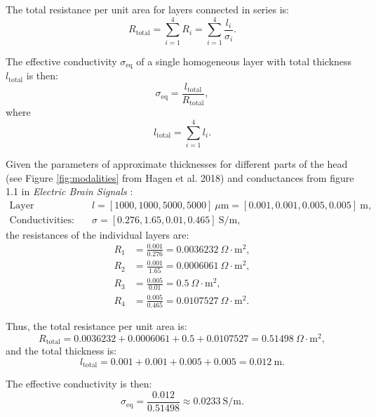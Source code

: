\documentclass[final, a4paper,masters,en,listoffigures,listoftables,norwegiandates]{NMBU}
\begin{document}
The total resistance per unit area for layers connected in series is:
\begin{equation}
    R_{\text{total}} = \sum_{i=1}^{4} R_i = \sum_{i=1}^{4} \frac{l_i}{\sigma_i}.
\end{equation}

The effective conductivity \( \sigma_{\text{eq}} \) of a single homogeneous layer with total thickness \( l_{\text{total}} \) is then:
\begin{equation}
    \sigma_{\text{eq}} = \frac{l_{\text{total}}}{R_{\text{total}}},
\end{equation}
where
\begin{equation}
    l_{\text{total}} = \sum_{i=1}^{4} l_i.
\end{equation}

Given the parameters of approximate thicknesses for different parts of the head (see Figure \ref{fig:modalities} from Hagen et al. 2018\cite{Hagen2018}) and conductances from figure 1.1 in \textit{Electric Brain Signals} \cite{Hagen_ElectricBrainSignals_repo}:
\begin{align*}
    \text{Layer Thicknesses:} \quad & l = [1000, 1000, 5000, 5000]\ \mu\text{m} = [0.001, 0.001, 0.005, 0.005]\ \text{m}, \\
    \text{Conductivities:} \quad & \sigma = [0.276, 1.65, 0.01, 0.465]\ \text{S/m},
\end{align*}
the resistances of the individual layers are:
\begin{align*}
    R_1 &= \frac{0.001}{0.276} = 0.0036232\ \Omega\cdot \text{m}^2, \\
    R_2 &= \frac{0.001}{1.65} = 0.0006061\ \Omega\cdot \text{m}^2, \\
    R_3 &= \frac{0.005}{0.01} = 0.5\ \Omega\cdot \text{m}^2, \\
    R_4 &= \frac{0.005}{0.465} = 0.0107527\ \Omega\cdot \text{m}^2.
\end{align*}

Thus, the total resistance per unit area is:
\begin{equation}
    R_{\text{total}} = 0.0036232 + 0.0006061 + 0.5 + 0.0107527 = 0.51498\ \Omega\cdot \text{m}^2,
\end{equation}
and the total thickness is:
\begin{equation}
    l_{\text{total}} = 0.001 + 0.001 + 0.005 + 0.005 = 0.012\ \text{m}.
\end{equation}

The effective conductivity is then:
\begin{equation}
    \sigma_{\text{eq}} = \frac{0.012}{0.51498} \approx 0.0233\ \text{S/m}.
\end{equation}
\end{document}
